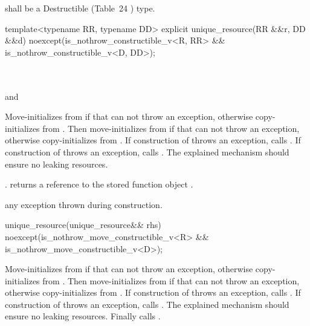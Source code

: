\documentclass[ebook,11pt,article]{memoir}
\begin{document}
\pnum
{} shall be a
Destructible 
(Table~24
) type.

\begin{itemdecl}
    template<typename RR, typename DD>
    explicit unique_resource(RR &&r, DD &&d)
        noexcept(is_nothrow_constructible_v<R, RR> &&
                 is_nothrow_constructible_v<D, DD>);
\end{itemdecl}

\begin{itemdescr}
\pnum
\requires\\ \\
and\\

\pnum
\effects Move-initializes  from  if that can not throw an exception, otherwise copy-initializes  from . Then move-initializes  from  if that can not throw an exception, otherwise copy-initializes  from . If construction of  throws an exception, calls .  If construction of  throws an exception, calls . 
\enternote
The explained mechanism should ensure no leaking resources.
\exitnote

\pnum
\postconditions {}.
 returns a reference to the stored
function object .

\pnum
\throws any exception thrown during construction.
\end{itemdescr}


\begin{itemdecl}
unique_resource(unique_resource&& rhs) 
  noexcept(is_nothrow_move_constructible_v<R> &&
           is_nothrow_move_constructible_v<D>);
\end{itemdecl}
\begin{itemdescr}
\pnum
\effects Move-initializes  from  if that can not throw an exception, otherwise copy-initializes  from . Then move-initializes  from  if that can not throw an exception, otherwise copy-initializes  from . If construction of  throws an exception, calls .  If construction of  throws an exception, calls . 
\enternote
The explained mechanism should ensure no leaking resources.
\exitnote
Finally calls . 
\end{itemdescr}
\end{document}
